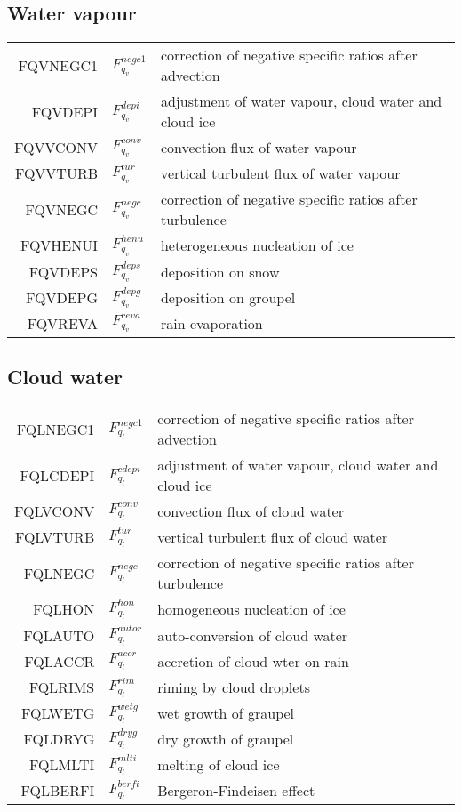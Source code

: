   \subsection{Water vapour}
  \begin{tabular}{rll}

       FQVNEGC1     &$F_{q_v}^{negc1}$ &correction of negative specific ratios after advection\\
       FQVDEPI      &$F_{q_v}^{depi}$ &adjustment of water vapour, cloud water and cloud ice\\
       FQVVCONV     &$F_{q_v}^{conv}$ &convection flux of water vapour\\
       FQVVTURB     &$F_{q_v}^{tur}$  &vertical turbulent flux of water vapour\\
       FQVNEGC      &$F_{q_v}^{negc}$ &correction of negative specific ratios after turbulence\\
       FQVHENUI     &$F_{q_v}^{henu}$ &heterogeneous nucleation of ice\\
       FQVDEPS      &$F_{q_v}^{deps}$ &deposition on snow\\
       FQVDEPG      &$F_{q_v}^{depg}$ &deposition on groupel\\
       FQVREVA      &$F_{q_v}^{reva}$ &rain evaporation\\
  \end{tabular}

  \subsection{Cloud water}
  \begin{tabular}{rll}

       FQLNEGC1     &$F_{q_l}^{negc1}$ &correction of negative specific ratios after advection\\
       FQLCDEPI     &$F_{q_l}^{cdepi}$ &adjustment of water vapour, cloud water and cloud ice\\
       FQLVCONV     &$F_{q_l}^{conv}$&convection flux of cloud water\\
       FQLVTURB     &$F_{q_l}^{tur}$  & vertical turbulent flux of cloud water\\
       FQLNEGC      &$F_{q_l}^{negc}$ &correction of negative specific ratios after turbulence\\
       FQLHON       &$F_{q_l}^{hon}$ &homogeneous nucleation of ice\\
       FQLAUTO      &$F_{q_l}^{autor}$ &auto-conversion of cloud water\\
       FQLACCR      &$F_{q_l}^{accr}$ &accretion of cloud wter on rain\\
       FQLRIMS      &$F_{q_l}^{rim}$ &riming by cloud droplets\\
       FQLWETG      &$F_{q_l}^{wetg}$ &wet growth of graupel\\
       FQLDRYG      &$F_{q_l}^{dryg}$ &dry growth of graupel\\
       FQLMLTI      &$F_{q_l}^{mlti}$ &melting of cloud ice\\
       FQLBERFI     &$F_{q_l}^{berfi}$ &Bergeron-Findeisen effect\\

  \end{tabular}

